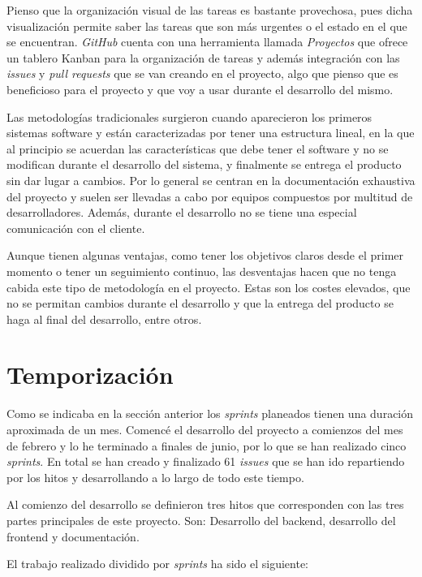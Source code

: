 Pienso que la organización visual de las tareas es bastante provechosa, pues dicha visualización permite saber las tareas que son más urgentes o el estado en el que se encuentran. \textit{GitHub} cuenta con una herramienta llamada \textit{Proyectos} que ofrece un tablero Kanban para la organización de tareas y además integración con las \textit{issues} y \textit{pull requests} que se van creando en el proyecto, algo que pienso que es beneficioso para el proyecto y que voy a usar durante el desarrollo del mismo.

Las metodologías tradicionales surgieron cuando aparecieron los primeros sistemas software y están caracterizadas por tener una estructura lineal, en la que al principio se acuerdan las características que debe tener el software y no se modifican durante el desarrollo del sistema, y finalmente se entrega el producto sin dar lugar a cambios. Por lo general se centran en la documentación exhaustiva del proyecto y suelen ser llevadas a cabo por equipos compuestos por multitud de desarrolladores. Además, durante el desarrollo no se tiene una especial comunicación con el cliente.

Aunque tienen algunas ventajas, como tener los objetivos claros desde el primer momento o tener un seguimiento continuo, las desventajas hacen que no tenga cabida este tipo de metodología en el proyecto. Estas son los costes elevados, que no se permitan cambios durante el desarrollo y que la entrega del producto se haga al final del desarrollo, entre otros.


\section{Temporización}

Como se indicaba en la sección anterior los \textit{sprints} planeados tienen una duración aproximada de un mes. Comencé el desarrollo del proyecto a comienzos del mes de febrero y lo he terminado a finales de junio, por lo que se han realizado cinco \textit{sprints}. En total se han creado y finalizado 61 \textit{issues} que se han ido repartiendo por los hitos y desarrollando a lo largo de todo este tiempo. 

Al comienzo del desarrollo se definieron tres hitos que corresponden con las tres partes principales de este proyecto. Son: Desarrollo del backend, desarrollo del frontend y documentación.

\bigskip
El trabajo realizado dividido por \textit{sprints} ha sido el siguiente:

